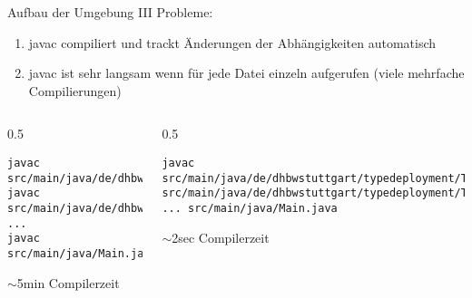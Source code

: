 \documentclass{beamer}
\begin{document}
\begin{frame}[fragile]{Aufbau der Umgebung III}
    Probleme:
    \begin{enumerate}
        \item javac compiliert und trackt Änderungen der Abhängigkeiten automatisch
        \item javac ist sehr langsam wenn für jede Datei einzeln aufgerufen (viele mehrfache Compilierungen)
    \end{enumerate}
    \begin{columns}
        \begin{column}{0.5\textwidth}
            \begin{lstlisting}
javac src/main/java/de/dhbwstuttgart/typedeployment/TypeInsert.java
javac src/main/java/de/dhbwstuttgart/typedeployment/TypeInsertPlacer.java
...
javac src/main/java/Main.java
                \end{lstlisting}
            $\sim{}$5min Compilerzeit
        \end{column}
        \begin{column}{0.5\textwidth}
            \begin{lstlisting}
javac src/main/java/de/dhbwstuttgart/typedeployment/TypeInsert.java src/main/java/de/dhbwstuttgart/typedeployment/TypeInsertPlacer.java ... src/main/java/Main.java
                \end{lstlisting}
            $\sim{}$2sec Compilerzeit
        \end{column}
    \end{columns}
\end{frame}
\end{document}

